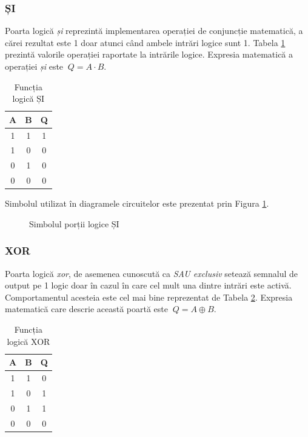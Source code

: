 \documentclass[12pt]{article}
\begin{document}
\subsubsection{ȘI}
Poarta logică \textit{și} reprezintă implementarea operației de conjuncție matematică, a cărei rezultat este 1 doar atunci când ambele intrări logice sunt 1. Tabela \ref{Tabela:9} prezintă valorile operației raportate la intrările logice. Expresia matematică a operației \textit{și} este $\ Q = A \cdot B$.
 \begin{table}[h]
\centering
\caption{Funcția logică ȘI}
\label{Tabela:9}
\begin{tabular}{ ||c|c|c|| }
 \hline
 A & B & Q\\ 
 \hline  \hline
 1 & 1 & 1 \\
 \hline
 1 & 0 & 0 \\
 \hline
 0 & 1 & 0 \\
 \hline 
 0 & 0 & 0 \\
 \hline
\end{tabular}
\end{table}

\newpage
Simbolul utilizat în diagramele circuitelor este prezentat prin Figura \ref{Figura:7}.

 \begin{figure}[h!]
 \centering
 \caption{Simbolul porții logice ȘI}
 \label{Figura:7}
 \end{figure}

\subsubsection{XOR}
Poarta logică \textit{xor}, de asemenea cunoscută ca \textit{SAU exclusiv} setează semnalul de output pe 1 logic doar în cazul în care cel mult una dintre intrări este activă. Comportamentul acesteia este cel mai bine reprezentat de Tabela \ref{Tabela:10}. Expresia matematică care descrie această poartă este $\ Q = A \oplus B$.
\begin{table}[h]
\centering
\caption{Funcția logică XOR}
\label{Tabela:10}
\begin{tabular}{ ||c|c|c|| }
 \hline
 A & B & Q\\ 
 \hline  \hline
 1 & 1 & 0 \\
 \hline
 1 & 0 & 1 \\
 \hline
 0 & 1 & 1 \\
 \hline 
 0 & 0 & 0 \\
 \hline
\end{tabular}
\end{table}
\end{document}
